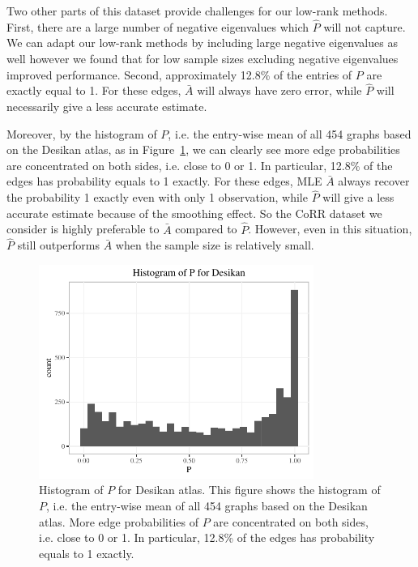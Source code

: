 Two other parts of this dataset provide challenges for our low-rank methods.
First, there are a large number of negative eigenvalues which $\hat{P}$ will not capture.
We can adapt our low-rank methods by including large negative eigenvalues as well however we found that for low sample sizes excluding negative eigenvalues improved performance.
Second, approximately 12.8\% of the entries of $P$ are exactly equal to 1.
For these edges, $\bar{A}$ will always have zero error, while $\hat{P}$ will necessarily give a less accurate estimate. 

Moreover, by the histogram of $P$, i.e. the entry-wise mean of all 454 graphs based on the Desikan atlas, as in Figure~\ref{fig:P_hist_desikan}, we can clearly see more edge probabilities are concentrated on both sides, i.e. close to 0 or 1. In particular, 12.8\% of the edges has probability equals to 1 exactly. For these edges, MLE $\bar{A}$ always recover the probability 1 exactly even with only 1 observation, while $\hat{P}$ will give a less accurate estimate because of the smoothing effect. So the CoRR dataset we consider is highly preferable to $\bar{A}$ compared to $\hat{P}$. 
However, even in this situation, $\hat{P}$ still outperforms $\bar{A}$ when the sample size is relatively small.

 \begin{figure}[!htbp]
 \centering
 \includegraphics[width=0.8\textwidth]{./Figures/P_hist_desikan.pdf}
 \caption[Histogram of mean graph for Desikan atlas]{Histogram of $P$ for Desikan atlas.
 This figure shows the histogram of $P$, i.e. the entry-wise mean of all 454 graphs based on the Desikan atlas. More edge probabilities of $P$ are concentrated on both sides, i.e. close to 0 or 1. In particular, 12.8\% of the edges has probability equals to 1 exactly.}
 \label{fig:P_hist_desikan}
 \end{figure}

